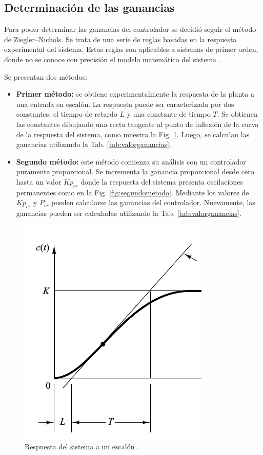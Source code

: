 \subsection{Determinación de las ganancias}
\label{subsec:ZiegerNichols}
Para poder determinar las ganancias del controlador se decidió seguir el método
de Ziegler–Nichols.
Se trata de una serie de reglas basadas en la respuesta experimental
del sistema.
Estas reglas son aplicables a sistemas de primer orden, donde no se conoce con
precisión el modelo matemático del sistema \cite{bib:Ogata}.

Se presentan dos métodos:
\begin{itemize}
 \item \textbf{Primer método:} se obtiene experimentalmente la respuesta de la
planta a una entrada en escalón.
 La respuesta puede ser caracterizada por dos constantes, el tiempo de retardo
$L$ y una constante de tiempo $T$.
Se obtienen las constantes dibujando
una recta tangente al  punto de inflexión de la curva de la respuesta del
sistema, como muestra la Fig. \ref{fig:primermetodo}.
Luego, se calculan las ganancias utilizando la Tab. \ref{tab:valorganancias}.

 \item \textbf{Segundo método:}
 este método comienza su análisis con un controlador puramente proporcional.
 Se incrementa  la ganancia proporcional desde cero hasta un valor $Kp_{cr} $
donde la respuesta del  sistema presenta oscilaciones permanentes como en la
Fig. \ref{fig:segundometodo}.
 Mediante los valores de $Kp_{cr} $ y $P_{cr}$ pueden calcularse las ganancias
del controlador.
Nuevamente, las ganancias pueden ser calculadas utilizando la Tab.
\ref{tab:valorganancias}.
\end{itemize}

\begin{figure}[ht]
 \centering
 \includegraphics[scale=0.5]{Cap4-ProgramacionPLC/images/primermetodo.png}
 \caption{Respuesta del sistema a un escalón \cite{bib:Ogata}.}
 \label{fig:primermetodo}
\end{figure}

